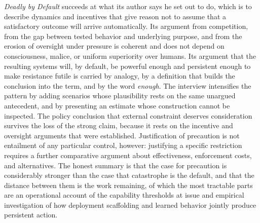\documentclass[11pt]{article}
\begin{document}
\textit{Deadly by Default} succeeds at what its author says he set out to do, which is to describe dynamics and incentives that give reason not to assume that a satisfactory outcome will arrive automatically. Its argument from competition, from the gap between tested behavior and underlying purpose, and from the erosion of oversight under pressure is coherent and does not depend on consciousness, malice, or uniform superiority over humans. Its argument that the resulting systems will, by default, be powerful enough and persistent enough to make resistance futile is carried by analogy, by a definition that builds the conclusion into the term, and by the word \textit{enough}. The interview intensifies the pattern by adding scenarios whose plausibility rests on the same unargued antecedent, and by presenting an estimate whose construction cannot be inspected. The policy conclusion that external constraint deserves consideration survives the loss of the strong claim, because it rests on the incentive and oversight arguments that were established. Justification of precaution is not entailment of any particular control, however: justifying a specific restriction requires a further comparative argument about effectiveness, enforcement costs, and alternatives. The honest summary is that the case for precaution is considerably stronger than the case that catastrophe is the default, and that the distance between them is the work remaining, of which the most tractable parts are an operational account of the capability thresholds at issue and empirical investigation of how deployment scaffolding and learned behavior jointly produce persistent action.
\end{document}
